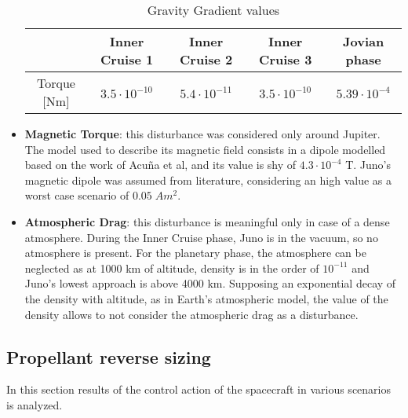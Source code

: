 \begin{itemize}
    \begin{table}[H]
        \renewcommand{\arraystretch}{1.3}
        \centering
        \begin{tabular}{|c|c|c|c|c|}
            \hline
            &\textbf{Inner Cruise 1} & \textbf{Inner Cruise 2} & \textbf{Inner Cruise 3} & \textbf{Jovian phase} \\
            \hline
            \hline
             Torque [Nm] & $3.5 \cdot 10^{-10}$ & $5.4 \cdot 10^{-11}$ & $3.5 \cdot 10^{-10}$ & $5.39 \cdot 10^{-4}$ \\
            \hline
        \end{tabular}
        \caption{Gravity Gradient values}
        \label{table:GGG}
    \end{table}
    
    \item \textbf{Magnetic Torque}: this disturbance was considered only around Jupiter. The model used to describe its magnetic field consists in a dipole modelled based on the work of Acuña et al\cite{jupiter_mag_field}, and its value is shy of $4.3\cdot 10^{-4}$ T. Juno's magnetic dipole was assumed from literature, considering an high value as a worst case scenario of $0.05 \; Am^2$.
    
    \item \textbf{Atmospheric Drag}: this disturbance is meaningful only in case of a dense atmosphere. During the Inner Cruise phase, Juno is in the vacuum, so no atmosphere is present. For the planetary phase, the atmosphere can be neglected as at 1000 km of altitude, density is in the order of $10^{-11}$ and Juno's lowest approach is above 4000 km. Supposing an exponential decay of the density with altitude, as in Earth's atmospheric model, the value of the density allows to not consider the atmospheric drag as a disturbance\cite{jupiter_density}.
    
        
\end{itemize}

\subsection{Propellant reverse sizing}
\label{subsec:prop_rev_sizing}

In this section results of the control action of the spacecraft in various scenarios is analyzed.

